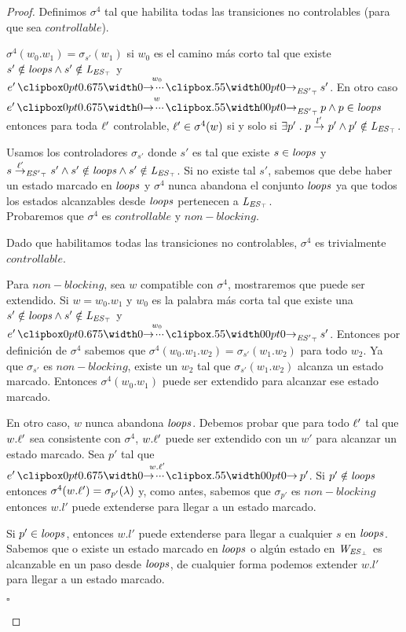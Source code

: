 \begin{proof}
Definimos $\sigma^4$ tal que habilita todas las transiciones no controlables (para que sea $controllable$).

$\sigma^4(w_0.w_1) = \sigma_{s'}(w_1)$ si $w_0$ es el camino más corto tal que existe $s' \notin \mathit{loops} \wedge s'\notin \mathit{L_{\mathit{{\mathit{ES}}_{\top}}}}$ y $e' \runw{w_0}{\unexploredToTop{\structure'}} s'$.
En otro caso $e' \runw{w}{\unexploredToTop{\structure'}} p \wedge p \in \SCC$ entonces para toda $\ell'$ controlable, $\ell' \in\sigma^4(w)$ si y solo si $\exists  p' \;.\; p \overset{l'}{\rightarrow}_{} p' \wedge p' \notin \mathit{L_{\mathit{{\mathit{ES}}_{\top}}}}$.

Usamos los controladores $\sigma_{s'}$ donde $s'$ es tal que existe $s \in \mathit{loops}$ y $s\overset{\ell'}{\rightarrow}_{\mathit{{\mathit{ES}'}_{\top}}} s'\wedge s' \notin \mathit{loops} \wedge s'\notin \mathit{L_{\mathit{{\mathit{ES}}_{\top}}}}$. Si no existe tal $s'$, sabemos que debe haber un estado marcado en $\mathit{loops}$ y $\sigma^4$ nunca abandona el conjunto $\mathit{loops}$ ya que todos los estados alcanzables desde $\mathit{loops}$ pertenecen a $\mathit{L_{\mathit{{\mathit{ES}}_{\top}}}}$.\\

Probaremos que $\sigma^4$ es $controllable$ y $non-blocking$.

Dado que habilitamos todas las transiciones no controlables, $\sigma^4$ es trivialmente \\ $controllable$.

Para $non-blocking$, sea $w$ compatible con $\sigma^4$, mostraremos que puede ser extendido. Si $w = w_0.w_1$ y $w_0$ es la palabra más corta tal que existe una $s' \notin \mathit{loops} \wedge s' \notin \mathit{L_{\mathit{{\mathit{ES}}_{\top}}}}$ y $e' \runw{w_0}{\unexploredToTop{\structure'}} s'$. Entonces por definición de $\sigma^4$ sabemos que  $\sigma^4(w_0.w_1.w_2) = \sigma_{s'}(w_1.w_2)$ para todo $w_2$. Ya que $\sigma_{s'}$ es $non-blocking$, existe un $w_2$ tal que $\sigma_{s'}(w_1.w_2)$ alcanza un estado marcado. Entonces $\sigma^4(w_0.w_1)$ puede ser extendido para alcanzar ese estado marcado. 

En otro caso, $w$ nunca abandona $\mathit{loops}$. Debemos probar que para todo $\ell'$ tal que $w.\ell'$ sea consistente con $\sigma^4$, $w.\ell'$ puede ser extendido con un $w'$ para alcanzar un estado marcado. Sea $p'$ tal que $e' \runw{w.\l'}{} p'$. Si $p' \notin \mathit{loops}$ entonces $\sigma^4(w.\ell') = \sigma_{p'}(\lambda)$ y, como antes, sabemos que $\sigma_{p'}$ es $non-blocking$ entonces $w.l'$ puede extenderse para llegar a un estado marcado.

Si $p' \in \mathit{loops}$, entonces $w.l'$ puede extenderse para llegar a cualquier $s$ en $\mathit{loops}$. Sabemos que o existe un estado marcado en $\mathit{loops}$ o algún estado en $\mathit{W_{\mathit{{\mathit{ES}}_{\bot}}}}$ es alcanzable en un paso desde $\mathit{loops}$, de cualquier forma podemos extender $w.l'$ para llegar a un estado marcado.\\
\begin{flushright}
	$\square$
\end{flushright}
\end{proof}


